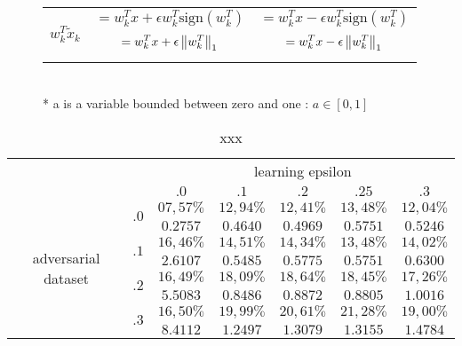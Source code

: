 \begin{figure}
\begin{tabular}{c||c|c}
				$ w^T_k \tilde{x}_k $  &
				\parbox{12em}{
					$$ = w^T_k x + \epsilon w^T_k \text{sign}(w^T_k) $$
					$$ = w^T_k x + \epsilon \left\lVert w^T_k\right\rVert_1 $$ }
				&
				\parbox{12em}{
					$$ = w^T_k x - \epsilon w^T_k \text{sign}(w^T_k) $$
					$$ = w^T_k x - \epsilon \left\lVert w^T_k\right\rVert_1 $$ }


			\end{tabular} \\ 
			* a is a variable bounded between zero and one : $a\in[0,1]$ \\
			\label{fig:adversarial_softmax}
		\end{figure}


		\begin{table}[h]
		\centering
		        \begin{tabular}{cc||ccccc}

		        	& &  \multicolumn{5}{c}{learning epsilon} \\
		        	& &  $.0$ & $.1$ & $.2$ & $.25$ & $.3$ \\
		            \hline \hline
		            \multirow{8}{*}{adversarial dataset} 
		            	& \multirow{2}{*}{$.0$} & $07,57\%$ & $12,94\%$ & $12,41\%$ & $13,48\%$ & $12,04\%$ \\ 
		            	&                       & $0.2757$  & $0.4640$  & $0.4969$  & $0.5751$  & $0.5246$  \\ \cline{2-7} 
		            	& \multirow{2}{*}{$.1$} & $16,46\%$ & $14,51\%$ & $14,34\%$ & $13,48\%$ & $14,02\%$ \\ 
		            	&                       & $2.6107$  & $0.5485$  & $0.5775$  & $0.5751$  & $0.6300$  \\ \cline{2-7} 
		            	& \multirow{2}{*}{$.2$} & $16,49\%$ & $18,09\%$ & $18,64\%$ & $18,45\%$ & $17,26\%$ \\
		            	&                       & $5.5083$  & $0.8486$  & $0.8872$  & $0.8805$  & $1.0016$  \\ \cline{2-7}
		                & \multirow{2}{*}{$.3$} & $16,50\%$ & $19,99\%$ & $20,61\%$ & $21,28\%$ & $19,00\%$ \\
		                &                       & $8.4112$  & $1.2497$  & $1.3079$  & $1.3155$  & $1.4784$  \\
		            
		        \end{tabular}
		    \caption{xxx}
		    \label{tab:xxx}
		\end{table}



